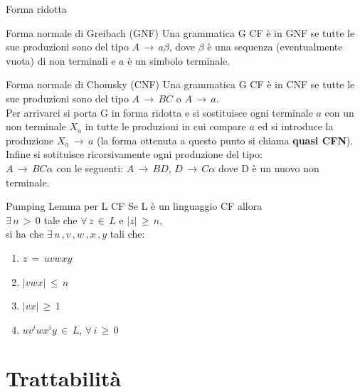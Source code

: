 \documentclass[10pt,a4paper]{article}
\begin{document}
\begin{multicols}{3}
\begin{textbox}{Forma ridotta}
\end{textbox}

\begin{textbox}{Forma normale di Greibach (GNF)}
Una grammatica G CF è in GNF se tutte le sue produzioni sono del tipo \(A\,\rightarrow\,a\beta\), dove \(\beta\) è una sequenza (eventualmente vuota) di non terminali e \(a\)  è un simbolo terminale.
\end{textbox}

\begin{textbox}{Forma normale di Chomsky (CNF)}
Una grammatica G CF è in CNF se tutte le sue produzioni sono del tipo \(A\,\rightarrow\,BC\) o \(A\,\rightarrow\,a\).\\
Per arrivarci si porta G in forma ridotta e si sostituisce ogni terminale \(a\) con un non terminale \(X_a\) in tutte le produzioni
in cui compare \(a\) ed si introduce la produzione \(X_a\,\rightarrow\,a\)
(la forma ottenuta a questo punto si chiama \textbf{quasi CFN}).\\
Infine si sotituisce ricorsivamente ogni produzione del tipo:\\
\(A\,\rightarrow\,BC\alpha\) con le seguenti:
\(A\,\rightarrow\,BD\), \(D\,\rightarrow\,C\alpha\) dove D è un nuovo non terminale.
\end{textbox}

\begin{textbox}{Pumping Lemma per L CF}
Se L è un linguaggio CF allora \\
\(\exists \, n \, > \, 0\) tale che \(\forall \, z \, \in \, L \) e
\(|z| \, \geq \, n\),\\si ha che
\(\exists \, u \, ,v \, ,w \, ,x \, ,y\) tali che:
\begin{enumerate}[leftmargin=*]
    \item \(z\, =\, uvwxy\)
    \item \(|vwx|\, \leq\,  n\)
    \item \(|vx|\, \geq\,  1\)
    \item \(uv^iwx^iy\,\in\,L,\,\forall\,i\,\geq\,0\)
\end{enumerate}
\end{textbox}


\section{Trattabilità}


\end{multicols}
\end{document}
